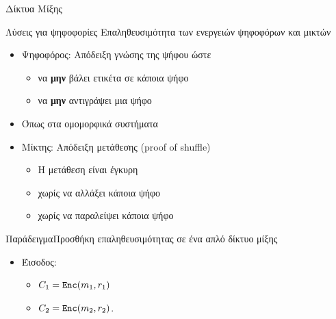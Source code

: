 \documentclass[handout]{beamer}
\begin{document}
\begin{section}{Δίκτυα Μίξης}
\begin{frame}{Λύσεις για ψηφοφορίες}
Επαληθευσιμότητα των ενεργειών ψηφοφόρων και μικτών \pause 
\begin{itemize}
  \item Ψηφοφόρος: Απόδειξη γνώσης της ψήφου ώστε 
  \begin{itemize}
   \item να \textbf{μην} βάλει ετικέτα σε κάποια ψήφο
   \item να \textbf{μην}  αντιγράψει μια ψήφο
  \end{itemize} \pause 
  \item Όπως στα ομομορφικά συστήματα \pause 
  \item Μίκτης: Απόδειξη μετάθεσης (proof of shuffle)
  \begin{itemize}
   \item Η μετάθεση είναι έγκυρη
   \item χωρίς να αλλάξει κάποια ψήφο
   \item χωρίς να παραλείψει κάποια ψήφο 
  \end{itemize}
\end{itemize}
\end{frame}
 
\begin{frame}[allowframebreaks]{Παράδειγμα}{Προσθήκη επαληθευσιμότητας σε ένα απλό δίκτυο μίξης} 

\begin{multicols}{2}
    \begin{itemize}
        \item Έισοδος: 
        \begin{itemize}
            \item  $C_1 = \mathtt{Enc}(m_1,r_1)$
            \item $C_2 = \mathtt{Enc}(m_2,r_2)$.
        \end{itemize}
        

\end{itemize}
\end{multicols}
\end{frame}
\end{section}
\end{document}
